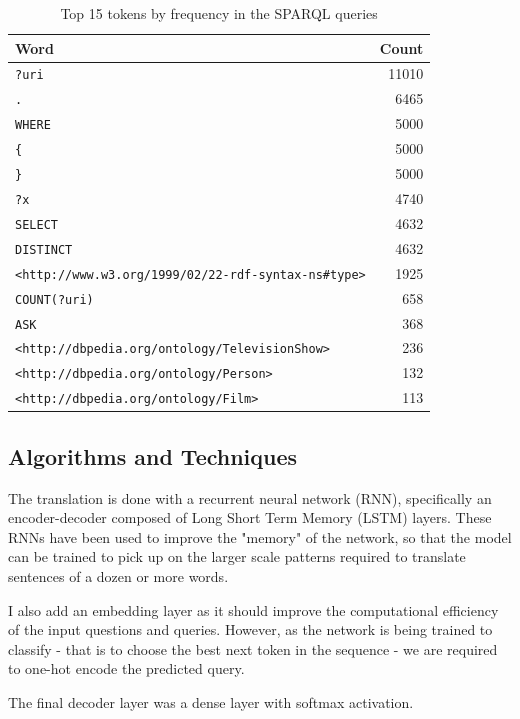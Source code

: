 \documentclass[12pt]{article}
\begin{document}
\begin{table}
  \centering
  \begin{tabular}{ l | r }
    \textbf{Word} & \textbf{Count} \\
    \hline
    \texttt{?uri} & 11010 \\
    \texttt{.} & 6465 \\
    \texttt{WHERE} & 5000 \\
    \texttt{\{} & 5000 \\
    \texttt{\}} & 5000 \\
    \texttt{?x} & 4740 \\
    \texttt{SELECT} & 4632 \\
    \texttt{DISTINCT} & 4632 \\
    \texttt{<http://www.w3.org/1999/02/22-rdf-syntax-ns\#type>} & 1925 \\
    \texttt{COUNT(?uri)} & 658 \\
    \texttt{ASK} & 368 \\
    \texttt{<http://dbpedia.org/ontology/TelevisionShow>} & 236 \\
    \texttt{<http://dbpedia.org/ontology/Person>} & 132 \\
    \texttt{<http://dbpedia.org/ontology/Film>} & 113
  \end{tabular}
  \caption{Top 15 tokens by frequency in the SPARQL queries}
  \label{tbl:sparql_token_freq}
\end{table}

\subsection{Algorithms and Techniques}\label{algorithms-and-techniques}

The translation is done with a recurrent neural network (RNN), specifically an
encoder-decoder composed of Long Short Term Memory (LSTM) layers. These RNNs have 
been used to improve the "memory" of the network, so that the model can be
trained to pick up on the larger scale patterns required to translate sentences
of a dozen or more words.

I also add an embedding layer as it should improve the computational 
efficiency of the input questions and queries. However, as the network is being
trained to classify - that is to choose the best next token in the sequence -
we are required to one-hot encode the predicted query. 

The final decoder layer was a dense layer with softmax activation.
\end{document}
